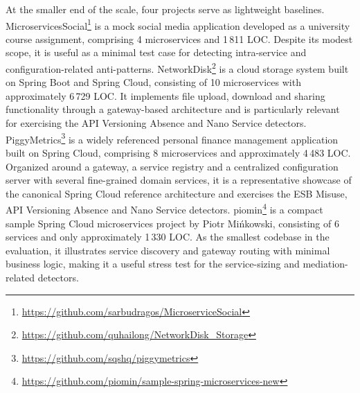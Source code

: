 \par At the smaller end of the scale, four projects serve as lightweight baselines. MicroservicesSocial\footnote{\url{https://github.com/sarbudragos/MicroserviceSocial}} is a mock social media application developed as a university course assignment, comprising 4 microservices and 1\,811 LOC. Despite its modest scope, it is useful as a minimal test case for detecting intra-service and configuration-related anti-patterns. NetworkDisk\footnote{\url{https://github.com/quhailong/NetworkDisk_Storage}} is a cloud storage system built on Spring Boot and Spring Cloud, consisting of 10 microservices with approximately 6\,729 LOC. It implements file upload, download and sharing functionality through a gateway-based architecture and is particularly relevant for exercising the API Versioning Absence and Nano Service detectors. PiggyMetrics\footnote{\url{https://github.com/sqshq/piggymetrics}} is a widely referenced personal finance management application built on Spring Cloud, comprising 8 microservices and approximately 4\,483 LOC. Organized around a gateway, a service registry and a centralized configuration server with several fine-grained domain services, it is a representative showcase of the canonical Spring Cloud reference architecture and exercises the ESB Misuse, API Versioning Absence and Nano Service detectors. piomin\footnote{\url{https://github.com/piomin/sample-spring-microservices-new}} is a compact sample Spring Cloud microservices project by Piotr Mi\'nkowski, consisting of 6 services and only approximately 1\,330 LOC. As the smallest codebase in the evaluation, it illustrates service discovery and gateway routing with minimal business logic, making it a useful stress test for the service-sizing and mediation-related detectors.

